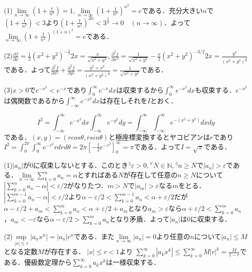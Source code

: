 \documentclass[
		book,
		head_space=20mm,
		foot_space=20mm,
		gutter=10mm,
		line_length=190mm
]{jlreq}
\begin{document}
    (1)$\lim\limits_{n\to \infty}(1+\frac{1}{n^2})=1,\lim\limits_{n\to \infty}(1+\frac{1}{n^2})^{n^2}=e$である．充分大きい$n$で$(1+\frac{1}{n^2})<3$より$(1+\frac{1}{n^2})^{2n} < 3^{\frac{2}{n}}\rightarrow 0 \quad(n \to \infty)$．よって$\lim\limits_{n \to \infty}(1+\frac{1}{n^2})^{(1+n)^2}=e$である．

    (2)$\frac{\partial f}{\partial x}=\frac{1}{2}(x^2+y^2)^{-\frac{1}{2}}2x=\frac{x}{\sqrt{x^2+y^2}},\frac{\partial^2 f}{\partial x^2} =\frac{1}{\sqrt{x^2+y^2}}-\frac{x}{2}(x^2+y^2)^{-3/2}2x=\frac{y^2}{(x^2+y^2)^{\frac{3}{2}}}$である．よって$\frac{\partial^2 f}{\partial x^2}+\frac{\partial^2 f}{\partial y^2}=\frac{y^2+x^2}{(x^2+y^2)^{\frac{3}{2}}}=\frac{1}{\sqrt{x^2+y^2}}$である．

    (3)$x>0$で$e^{-x^2} < e^{-x}$であり$\int_0^{\infty} e^{-x}dx$は収束するから$\int_0^{\infty} e^{-x^2}dx$も収束する．$e^{-x^2}$は偶関数であるから$\int_{-\infty}^{\infty} e^{-x^2}dx$は存在しそれを$I$とおく．

    \begin{equation}
        I^2=\int_{-\infty}^{\infty} e^{-x^2}dx\int_{-\infty}^{\infty} e^{-y^2}dy=\int_{-\infty}^{\infty}\int_{-\infty}^{\infty} e^{-(x^2+y^2)}dxdy
    \end{equation}である．$(x,y)=(rcos \theta,rsin \theta)$と極座標変換するとヤコビアンは$r$であり$I^2=\int_0^{2\pi}\int_0^{\infty} e^{-r^2}rdrd\theta=2\pi[-\frac{1}{2}e^{-r^2}]_0^{\infty}=\pi$である．よって$I=\sqrt{\pi}$である．

    (1)$|a_n|$が$0$に収束しないとする．このとき${}^{\exists}\varepsilon>0,{}^{\forall}N \in \mathbb{N},{}^{\exists}n \geq N$で$|a_n|>\varepsilon$である．$\lim\limits_{n \to \infty}\sum\limits_{k=0}^n a_n=\alpha$とすればある$N$が存在して任意の$n \ge N$について$|\sum\limits_{k=0}^n a_n-\alpha|<\varepsilon/2$がなりたつ．$m>N$で$|a_m|>\varepsilon$なる$m$をとる．$|\sum\limits_{k=0}^{m-1} a_n-\alpha|<\varepsilon/2$より$\alpha-\varepsilon/2<\sum\limits_{k=0}^{m-1} a_n< \alpha+\varepsilon/2$だが$\alpha-\varepsilon/2+a_m < \sum\limits_{k=0}^m a_n < \alpha+\varepsilon/2+a_m$となり$a_m > \varepsilon$なら$\alpha + \varepsilon/2 < \sum\limits_{k=0}^m a_n $，$a_m < -\varepsilon$なら$\alpha - \varepsilon/2 > \sum\limits_{k=0}^m a_n$となり矛盾．よって$|a_n|$は$0$に収束する．

    (2)$\sup\limits_{|x| \le r}|a_nx^n|=|a_n|r^n$である．また$\lim\limits_{n \to \infty}|a_n|=0$より任意の$n$について$|a_n| \le M$となる定数$M$が存在する．
    $|x| \le r <1$より
    $\sum\limits_{k=0}^{\infty} |a_kx^k| \le \sum\limits_{k=0}^{\infty} M |r|^k = \frac{M}{1-r}$である．優級数定理から$\sum\limits_{k=0}^{\infty} a_kx^k$は一様収束する．
\end{document}
